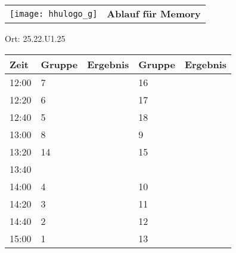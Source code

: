 \documentclass[a4paper,10pt]{article}
\def\spielg{Memory}
\def\raumgg{25.22.U1.25}
\begin{document}
   \newpage
  \begin{tabularx}{\textwidth}{lc}
    \texttt{[image: hhulogo\_g]}
  & {\Huge \textbf{Ablauf für \spielg}}
  \end{tabularx}
  \LARGE
  \begin{center}
    \vspace{1cm} 
    Ort: \raumgg
  \end{center}
    \vspace{2cm} 
    \begin{tabularx}{\textwidth}{X||X|X||X|X}
	\textbf{Zeit} &\textbf{Gruppe} & \textbf{Ergebnis} &\textbf{Gruppe} & \textbf{Ergebnis}  	\\ \hline \hline
	12:00 &	7	&	&16	&	\\ \hline
	12:20 &	6	&	&17	&	\\ \hline
	12:40 &	5	&	&18	&	\\ \hline

	13:00 &	8	&	&9	&	\\ \hline
	13:20 &	14	&	&15	&	\\ \hline
	13:40 &		&	&	&	\\ \hline

	14:00 &	4	&	&10	&	\\ \hline
	14:20 &	3	&	&11	&	\\ \hline
	14:40 &	2	&	&12	&	\\ \hline

	15:00 &	1	&	&13	&	\\ \hline
      
    \end{tabularx}
   
   \newpage
\end{document}
